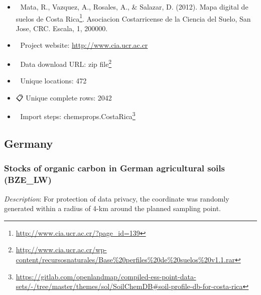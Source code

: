 \documentclass[
  graybox,natbib,nospthms]{svmono}
\providecommand{\tightlist}{%
  \setlength{\itemsep}{0pt}\setlength{\parskip}{0pt}}
\providecommand{\tightlist}{\setlength{\itemsep}{0pt}\setlength{\parskip}{0pt}}
\renewcommand{\href}[2]{#2 (\url{#1})}
\renewcommand{\href}[2]{#2\footnote{\url{#1}}}
\begin{document}
\begin{itemize}
\tightlist
\item
  📕 Mata, R., Vazquez, A., Rosales, A., \& Salazar, D. (2012). \href{http://www.cia.ucr.ac.cr/?page_id=139}{Mapa digital de suelos de Costa Rica}. Asociacion Costarricense de la Ciencia del Suelo, San Jose, CRC. Escala, 1, 200000.\\
\item
  🔗 Project website: \url{http://www.cia.ucr.ac.cr}\\
\item
  📂 Data download URL: \href{http://www.cia.ucr.ac.cr/wp-content/recursosnaturales/Base\%20perfiles\%20de\%20suelos\%20v1.1.rar}{zip file}\\
\item
  📍 Unique locations: 472\\
\item
  📋 Unique complete rows: 2042\\
\item
  📝 Import steps: \href{https://gitlab.com/openlandmap/compiled-ess-point-data-sets/-/tree/master/themes/sol/SoilChemDB\#soil-profile-db-for-costa-rica}{chemsprops.CostaRica}
\end{itemize}

\hypertarget{germany}{%
\subsection{Germany}\label{germany}}

\hypertarget{stocks-of-organic-carbon-in-german-agricultural-soils-bze_lw}{%
\subsubsection{Stocks of organic carbon in German agricultural soils (BZE\_LW)}\label{stocks-of-organic-carbon-in-german-agricultural-soils-bze_lw}}

\emph{Description}: For protection of data privacy, the coordinate was randomly generated
within a radius of 4-km around the planned sampling point.
\end{document}
